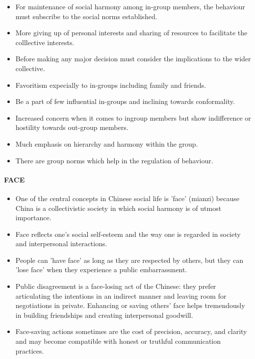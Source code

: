 \begin{itemize}
    \item For maintenance of social harmony among in-group members, the
        behaviour must subscribe to the social norms established.
    \item More giving up of personal interests and sharing of resources to
        facilitate the colllective interests.
    \item Before making any major decision must consider the implications to
        the wider collective.
    \item Favoritism expecially to in-groups including family and friends.
    \item Be a part of few influential in-groups and inclining towards
        conformality.
    \item Increased concern when it comes to ingroup members but show indifference
        or hostility towards out-group members.
    \item Much emphasis on hierarchy and harmony within the group.
    \item There are group norms which help in the regulation of behaviour.
\end{itemize}

\paragraph{FACE}
\begin{itemize}
    \item One of the central concepts in Chinese social life is 'face' (mianzi)
        because China is a collectivistic society in which social harmony is of
        utmost importance.
    \item Face reflects one's social self-esteem and the way one is regarded in
        society and interpersonal interactions.
    \item People can 'have face' as long as they are respected by others, but
        they can 'lose face' when they experience a public embarrassment.
    \item Public disagreement is a face-losing act of the Chinese: they prefer
        articulating the intentions in an indirect manner and leaving room for
        negotiations in private. Enhancing or saving others' face helps
        tremendously in building friendships and creating interpersonal goodwill.
    \item Face-saving actions sometimes are the cost of precision, accuracy, and
        clarity and may become compatible with honest or truthful communication
        practices.
\end{itemize}

